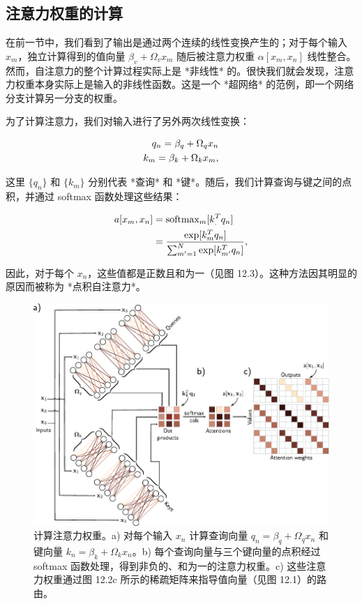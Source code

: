 \documentclass[lang=cn,newtx,10pt,scheme=chinese]{elegantbook}
\begin{document}
\subsection{注意力权重的计算}
在前一节中，我们看到了输出是通过两个连续的线性变换产生的；对于每个输入 \(x_m\)，独立计算得到的值向量 \(\beta_v + \Omega_vx_m\) 随后被注意力权重 \(\alpha[x_m, x_n]\) 线性整合。然而，自注意力的整个计算过程实际上是 *非线性* 的。很快我们就会发现，注意力权重本身实际上是输入的非线性函数。这是一个 *超网络* 的范例，即一个网络分支计算另一分支的权重。

为了计算注意力，我们对输入进行了另外两次线性变换：


\begin{align}
q_n = \beta_q + \Omega_qx_n \notag \\
k_m = \beta_k + \Omega_kx_m, 
\end{align}


这里 \(\{q_n\}\) 和 \(\{k_m\}\) 分别代表 *查询* 和 *键*。随后，我们计算查询与键之间的点积，并通过 softmax 函数处理这些结果：


\begin{align}
a[x_m, x_n] &= \text{softmax}_{m} [k_.^T q_n] \notag \\
&= \frac{\exp[k_m^T q_n]}{\sum_{m'=1}^N \exp[k_{m'}^T q_n]}, 
\end{align} 


因此，对于每个 \(x_n\)，这些值都是正数且和为一（见图 12.3）。这种方法因其明显的原因而被称为 *点积自注意力*。

\begin{figure}[ht!]
\centering
\includegraphics[width=0.7\linewidth]{PDFFigures/UDLChap12PDF/TransformerSA2.pdf}
\caption{计算注意力权重。a) 对每个输入 \(x_n\) 计算查询向量 \(q_n = \beta_q + \Omega_qx_n\) 和键向量 \(k_n = \beta_k + \Omega_kx_n\)。b) 每个查询向量与三个键向量的点积经过 softmax 函数处理，得到非负的、和为一的注意力权重。c) 这些注意力权重通过图 12.2c 所示的稀疏矩阵来指导值向量（见图 12.1）的路由。}
\end{figure}
\end{document}
